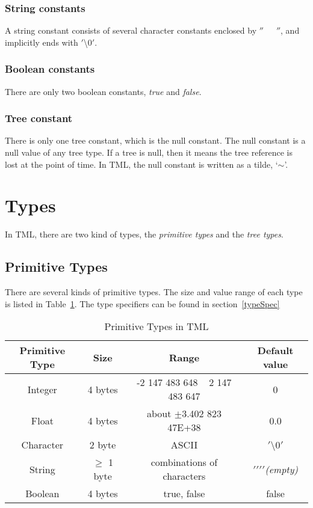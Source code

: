 \documentclass[12pt,psfig,a4]{article}
\begin{document}
\subsubsection {String constants}
A string constant consists of several character constants enclosed by $''$~~~$''$, and implicitly ends with $'$\textbackslash$0'$.

\subsubsection {Boolean constants}
There are only two boolean constants, \textit{true} and \textit{false}.

\subsubsection {Tree constant}
There is only one tree constant, which is the null constant. The null constant is a null value of any tree type. If a tree is null, then it means the tree reference is lost at the point of time. In TML, the null constant is written as a tilde, `$\sim$'.


\section {Types}
In TML, there are two kind of types, the \textit{primitive types} and the \textit{tree types}.

\subsection {Primitive Types}
There are several kinds of primitive types. The size and value range of each type is listed in Table~\ref{pri_types}. The type specifiers can be found in section~\ref{typeSpec}

\begin{table}[!ht]
\begin{center}
\begin{tabular}{| c | c | c | c |}
\hline
\textbf{Primitive Type} & \textbf{Size} & \textbf{Range} & \textbf{Default value} \\
\hline
Integer & 4 bytes & -2 147 483 648 ~  2 147 483 647 & 0 \\
\hline
Float & 4 bytes & about $\pm$3.402 823 47E+38 & 0.0\\
\hline
Character & 2 byte &  ASCII & $'$\textbackslash$0'$\\  %
\hline
String & $\geq$ 1 byte & combinations of characters & $'$$'$$'$$'$\textit{(empty)} \\
\hline
Boolean & 4 bytes & true, false & false \\
\hline
\end{tabular}
\caption{Primitive Types in TML}
\label{pri_types}
\end {center}
\end{table}
\end{document}
